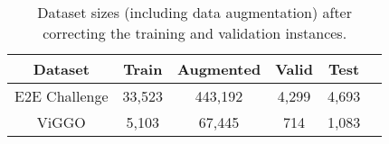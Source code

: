 \begin{table}
\centering
\begin{tabular}{cc cccc}
\toprule
Dataset & Train & Augmented & Valid & Test \\
\midrule
E2E Challenge & 33,523 & 443,192 & 4,299  & 4,693 \\
ViGGO         &  5,103 &  67,445 & 714 & 1,083 \\
\bottomrule
\end{tabular}
\caption{Dataset sizes (including data augmentation) after correcting
the training and validation instances.}
\label{tab:cgdata}
\end{table}
